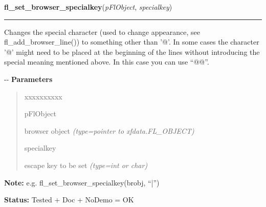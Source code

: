\hspace{.8\funcindent}\begin{boxedminipage}{\funcwidth}

    \raggedright \textbf{fl\_set\_browser\_specialkey}(\textit{pFlObject}, \textit{specialkey})

    \vspace{-1.5ex}

    \rule{\textwidth}{0.5\fboxrule}
\setlength{\parskip}{2ex}

Changes the special character (used to change appearance, see
fl\_add\_browser\_line()) to something other than '@'. In some cases the
character '@' might need to be placed at the beginning of the lines
without introducing the special meaning mentioned above. In this case you
can use ``@@''.

-{}-
\setlength{\parskip}{1ex}
      \textbf{Parameters}
      \vspace{-1ex}

      \begin{quote}
        \begin{Ventry}{xxxxxxxxxx}

          \item[pFlObject]


browser object
            {\it (type=pointer to xfdata.FL\_OBJECT)}

          \item[specialkey]


escape key to be set
            {\it (type=int or char)}

        \end{Ventry}

      \end{quote}

\textbf{Note:} 
e.g. fl\_set\_browser\_specialkey(brobj, ``|'')


\textbf{Status:} 
Tested + Doc + NoDemo = OK


    \end{boxedminipage}

    \label{xformslib:flbrowser:fl_set_browser_vscrollbar}

    \vspace{0.5ex}

